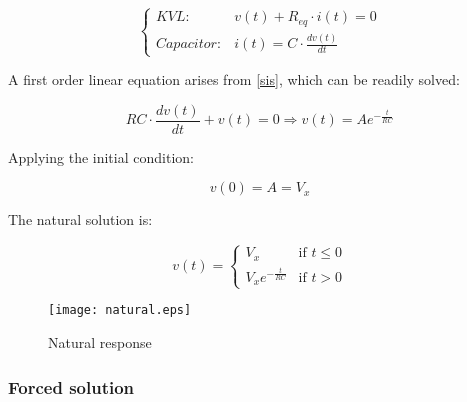 \begin{equation}
  \begin{cases}
    KVL: & v(t) + R_{eq} \cdot i(t) = 0 \\
    Capacitor: & i(t) = C \cdot \frac{dv(t)}{dt}
  \end{cases}
  \label{sis}
\end{equation}

A first order linear equation arises from \ref{sis}, which can be readily solved:

\begin{equation}
  RC \cdot \frac{dv(t)}{dt} + v(t) = 0 \Rightarrow v(t) = Ae^{-\frac{t}{RC}}
\end{equation}

Applying the initial condition:

\begin{equation}
  v(0) = A = V_x
\end{equation}

The natural solution is:

\begin{equation}
  \label{nat_sol} v(t) =
  \begin{cases}
    V_x & \mbox{if } t \leq 0 \\
    V_xe^{-\frac{t}{RC}} & \mbox{if } t > 0
  \end{cases}
\end{equation}

\begin{figure}[H]
  \centering
  \texttt{[image: natural.eps]}
  \caption{Natural response}
  \label{fig:nat}
\end{figure}

\subsubsection{Forced solution}
